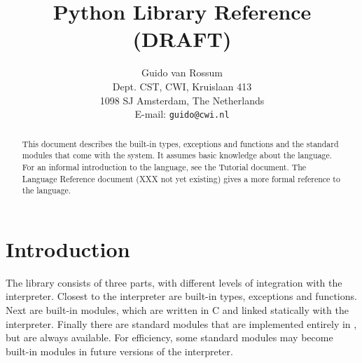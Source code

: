 

\newcommand{\itembreak}{
	\mbox{}\\*[0mm]
}

\newcommand{\funcitem}[2]{\item[#1(#2)]}

\newcommand{\excitem}[2]{
\item[#1 = {\tt '#2'}]
\itembreak
}

\title{\bf
	Python Library Reference \\
	(DRAFT)
}

\author{
	Guido van Rossum \\
	Dept. CST, CWI, Kruislaan 413 \\
	1098 SJ Amsterdam, The Netherlands \\
	E-mail: {\tt guido@cwi.nl}
}




\maketitle

\begin{abstract}

\noindent
This document describes the built-in types, exceptions and functions and
the standard modules that come with the {\Python} system.
It assumes basic knowledge about the {\Python} language.
For an informal introduction to the language, see the Tutorial document.
The Language Reference document (XXX not yet existing)
gives a more formal reference to the language.

\end{abstract}

\pagebreak

\tableofcontents

\pagebreak


\section{Introduction}

The {\Python} library consists of three parts, with different levels of
integration with the interpreter.
Closest to the interpreter are built-in types, exceptions and functions.
Next are built-in modules, which are written in C and linked statically
with the interpreter.
Finally there are standard modules that are implemented entirely in
{\Python}, but are always available.
For efficiency, some standard modules may become built-in modules in
future versions of the interpreter.

